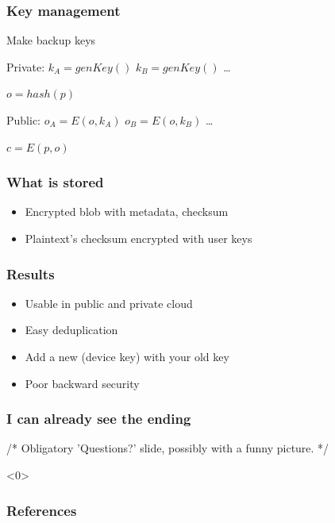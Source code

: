\documentclass{beamer}
\begin{document}

\begin{frame}
    \frametitle{Key management}
    Make backup keys

    Private:
    $k_A = genKey()$
    $k_B = genKey()$
    \dots

    $o = hash(p)$

    Public:
    $o_A = E(o, k_A)$
    $o_B = E(o, k_B)$
    \dots

    $c = E(p,o)$
\end{frame}

\begin{frame}
    \frametitle{What is stored}
    \begin{itemize}
    \item Encrypted blob with metadata, checksum
    \item Plaintext's checksum encrypted with user keys
    \end{itemize}
\end{frame}

\begin{frame}
    \frametitle{Results}
    \begin{itemize}
    \item Usable in public and private cloud
    \item Easy deduplication
    \item Add a new (device key) with your old key
    \item Poor backward security
    \end{itemize}
\end{frame}

\begin{frame}
    \frametitle{I can already see the ending}
    /* Obligatory 'Questions?' slide, possibly with a funny picture. */
\end{frame}

\begin{frame}<0>
    \frametitle{References}
    
    
\end{frame}
\end{document}
